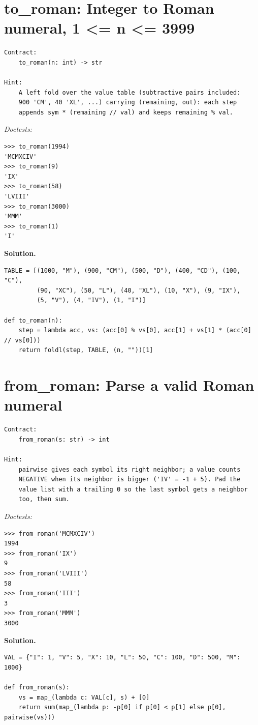 \documentclass[11pt,letterpaper]{book}
\begin{document}
\section{to\_roman: Integer to Roman numeral, 1 <= n <= 3999}
\begin{lstlisting}[style=spec]
Contract:
    to_roman(n: int) -> str

Hint:
    A left fold over the value table (subtractive pairs included:
    900 'CM', 40 'XL', ...) carrying (remaining, out): each step
    appends sym * (remaining // val) and keeps remaining % val.
\end{lstlisting}
\noindent\textit{Doctests:}
\begin{lstlisting}[style=spec]
>>> to_roman(1994)
'MCMXCIV'
>>> to_roman(9)
'IX'
>>> to_roman(58)
'LVIII'
>>> to_roman(3000)
'MMM'
>>> to_roman(1)
'I'
\end{lstlisting}
\noindent\textbf{Solution.}
\begin{lstlisting}[style=code]
TABLE = [(1000, "M"), (900, "CM"), (500, "D"), (400, "CD"), (100, "C"),
         (90, "XC"), (50, "L"), (40, "XL"), (10, "X"), (9, "IX"),
         (5, "V"), (4, "IV"), (1, "I")]

def to_roman(n):
    step = lambda acc, vs: (acc[0] % vs[0], acc[1] + vs[1] * (acc[0] // vs[0]))
    return foldl(step, TABLE, (n, ""))[1]
\end{lstlisting}

\section{from\_roman: Parse a valid Roman numeral}
\begin{lstlisting}[style=spec]
Contract:
    from_roman(s: str) -> int

Hint:
    pairwise gives each symbol its right neighbor; a value counts
    NEGATIVE when its neighbor is bigger ('IV' = -1 + 5). Pad the
    value list with a trailing 0 so the last symbol gets a neighbor
    too, then sum.
\end{lstlisting}
\noindent\textit{Doctests:}
\begin{lstlisting}[style=spec]
>>> from_roman('MCMXCIV')
1994
>>> from_roman('IX')
9
>>> from_roman('LVIII')
58
>>> from_roman('III')
3
>>> from_roman('MMM')
3000
\end{lstlisting}
\noindent\textbf{Solution.}
\begin{lstlisting}[style=code]
VAL = {"I": 1, "V": 5, "X": 10, "L": 50, "C": 100, "D": 500, "M": 1000}

def from_roman(s):
    vs = map_(lambda c: VAL[c], s) + [0]
    return sum(map_(lambda p: -p[0] if p[0] < p[1] else p[0], pairwise(vs)))
\end{lstlisting}
\end{document}
